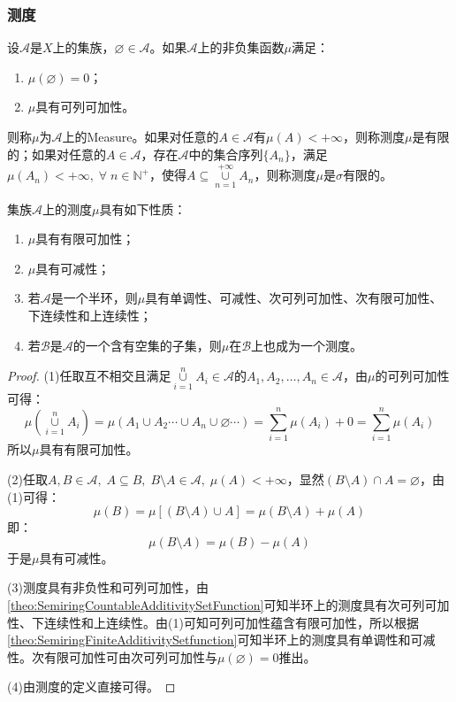 \subsubsection{测度}
\begin{definition}
	设$\mathscr{A}$是$X$上的集族，$\varnothing\in\mathscr{A}$。如果$\mathscr{A}$上的非负集函数$\mu$满足：
	\begin{enumerate}
		\item $\mu(\varnothing)=0$；
		\item $\mu$具有可列可加性。
	\end{enumerate}
	则称$\mu$为$\mathscr{A}$上的\gls{Measure}。如果对任意的$A\in\mathscr{A}$有$\mu(A)<+\infty$，则称测度$\mu$是有限的；如果对任意的$A\in\mathscr{A}$，存在$\mathscr{A}$中的集合序列$\{A_n\}$，满足$\mu(A_n)<+\infty,\;\forall\;n\in\mathbb{N}^+$，使得$A\subseteq\underset{n=1}{\overset{+\infty}{\cup}}A_n$，则称测度$\mu$是$\sigma$有限的。
\end{definition}
\begin{property}\label{prop:Measure}
	集族$\mathscr{A}$上的测度$\mu$具有如下性质：
	\begin{enumerate}
		\item $\mu$具有有限可加性；
		\item $\mu$具有可减性；
		\item  若$\mathscr{A}$是一个半环，则$\mu$具有单调性、可减性、次可列可加性、次有限可加性、下连续性和上连续性；
		\item 若$\mathscr{B}$是$\mathscr{A}$的一个含有空集的子集，则$\mu$在$\mathscr{B}$上也成为一个测度。
	\end{enumerate}
\end{property}
\begin{proof}
	(1)任取互不相交且满足$\underset{i=1}{\overset{n}{\cup}}A_i\in\mathscr{A}$的$A_1,A_2,\dots,A_n\in\mathscr{A}$，由$\mu$的可列可加性可得：
	\begin{equation*}
		\mu\left(\underset{i=1}{\overset{n}{\cup}}A_i\right)=\mu(A_1\cup A_2\cdots\cup A_n\cup\varnothing\cdots)=\sum_{i=1}^{n}\mu(A_i)+0=\sum_{i=1}^{n}\mu(A_i)
	\end{equation*}
	所以$\mu$具有有限可加性。\par
	(2)任取$A,B\in\mathscr{A},\;A\subseteq B,\;B\setminus A\in\mathscr{A},\;\mu(A)<+\infty$，显然$(B\setminus A)\cap A=\varnothing$，由(1)可得：
	\begin{equation*}
		\mu(B)=\mu[(B\setminus A)\cup A]=\mu(B\setminus A)+\mu(A)
	\end{equation*}
	即：
	\begin{equation*}
		\mu(B\setminus A)=\mu(B)-\mu(A)
	\end{equation*}
	于是$\mu$具有可减性。\par
	(3)测度具有非负性和可列可加性，由\cref{theo:SemiringCountableAdditivitySetFunction}可知半环上的测度具有次可列可加性、下连续性和上连续性。由(1)可知可列可加性蕴含有限可加性，所以根据\cref{theo:SemiringFiniteAdditivitySetfunction}可知半环上的测度具有单调性和可减性。次有限可加性可由次可列可加性与$\mu(\varnothing)=0$推出。\par
	(4)由测度的定义直接可得。
\end{proof}
